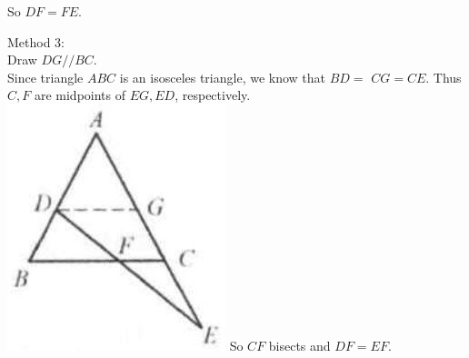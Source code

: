 \documentclass{article}
\begin{document}
So \(D F=F E\).

Method 3:\\
Draw \(D G / / B C\).\\
Since triangle \(A B C\) is an isosceles triangle, we know that \(B D=\) \(C G=C E\). Thus \(C, F\) are midpoints of \(E G, E D\), respectively.\\
\includegraphics[width=\textwidth]{images/102(1).jpg} So \(C F\) bisects and \(D F=E F\).
\end{document}
